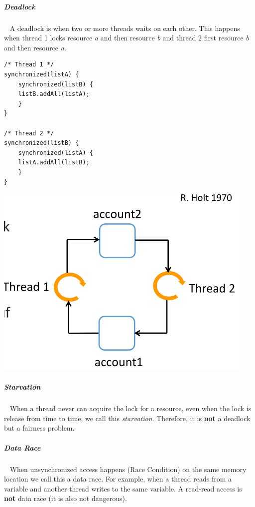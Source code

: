 \documentclass[11pt,twoside,landscape]{article}
\begin{document}
\begin{multicols}{3}
\subparagraph{Deadlock} \
\label{sec:orga1d707a}
A deadlock is when two or more threads waits on each other.
This happens when thread 1 locks resource \emph{a} and then resource \emph{b} and thread 2 first resource \emph{b} and then resource \emph{a}.

\lstset{language=java,label= ,caption= ,captionpos=b,numbers=none}
\begin{lstlisting}
/* Thread 1 */
synchronized(listA) {
    synchronized(listB) {
	listB.addAll(listA);
    }
}

/* Thread 2 */
synchronized(listB) {
    synchronized(listA) {
	listA.addAll(listB);
    }
}

\end{lstlisting}

{
\begin{center}
\includegraphics[width=.9\linewidth]{img/deadlock_graph.png}
\end{center}
\label{fig:deadlock-detecion-using-resource-graph}
}

\subparagraph{Starvation} \
\label{sec:org5f4a671}
When a thread never can acquire the lock for a resource, even when the lock is release from time to time, we call this \emph{starvation}.
Therefore, it is \textbf{not} a deadlock but a fairness problem.

\subparagraph{Data Race} \
\label{sec:orgcc95304}
When unsynchronized access happens (Race Condition) on the same memory location we call this a data race.
For example, when a thread reads from a variable and another thread writes to the same variable.
A read-read access is \textbf{not} data race (it is also not dangerous).



\end{multicols}
\end{document}
